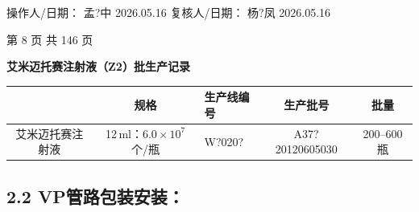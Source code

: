 \documentclass[UTF8,10pt,a4paper,fontset=fandol]{ctexart}
\newcommand{\fieldvalue}[1]{#1}
\newcommand{\handwritten}[1]{#1}
\begin{document}
\vspace{0.3em}

\noindent
操作人/日期：%
\fieldvalue{\handwritten{孟?中}}\quad
\fieldvalue{\handwritten{2026.05.16}}
\qquad
复核人/日期：%
\fieldvalue{\handwritten{杨?凤}}\quad
\fieldvalue{\handwritten{2026.05.16}}

\begin{center}
第 8 页 共 146 页
\end{center}

\newpage

\begin{center}
\textbf{艾米迈托赛注射液（Z2）批生产记录}
\end{center}

\begin{tabularx}{\textwidth}{|c|c|X|c|c|}
\hline
 & 规格 & 生产线编号 & 生产批号 & 批量 \\ \hline
艾米迈托赛注射液 &
12\,ml：$6.0\times10^{7}$个/瓶 &
\fieldvalue{\handwritten{W?020?}} &
\fieldvalue{\handwritten{A37?20120605030}} &
200--600 瓶 \\ \hline
\end{tabularx}

\subsection*{2.2 VP管路包装安装：}
\end{document}
